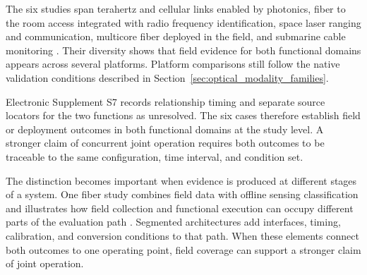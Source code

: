 The six studies span terahertz and cellular links enabled by photonics, fiber
to the room access integrated with radio frequency identification, space laser
ranging and communication, multicore fiber deployed in the field, and
submarine cable monitoring
\cite{OISAC_SCR01054,OISAC_SCR00496,OISAC_SCR00631,OISAC_SCR00730,OISAC_SCR01086,OISAC_SCR00957}.
Their diversity shows that field evidence for both functional domains appears
across several platforms. Platform comparisons still follow the native
validation conditions described in Section~\ref{sec:optical_modality_families}.

Electronic Supplement S7 records relationship timing and separate source
locators for the two functions as unresolved. The six cases therefore
establish field or deployment outcomes in both functional domains at the study
level. A stronger claim of concurrent joint operation requires both outcomes
to be traceable to the same configuration, time interval, and condition set.

The distinction becomes important when evidence is produced at different
stages of a system. One fiber study combines field data with offline sensing
classification and illustrates how field collection and functional execution
can occupy different parts of the evaluation path \cite{OISAC_SCR01006}.
Segmented architectures add interfaces, timing, calibration, and conversion
conditions to that path. When these elements connect both outcomes to one
operating point, field coverage can support a stronger claim of joint
operation.

